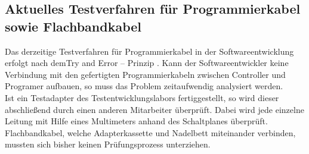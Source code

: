 
\subsection{Aktuelles Testverfahren für Programmierkabel sowie Flachbandkabel}
Das derzeitige Testverfahren für Programmierkabel in der Softwareentwicklung erfolgt nach dem\glqq Try and Error – Prinzip \grqq{} . Kann der Softwareentwickler keine Verbindung mit den gefertigten Programmierkabeln zwischen Controller und Programer aufbauen, so muss das Problem zeitaufwendig analysiert werden.
\\
Ist ein Testadapter des Testentwicklungslabors fertiggestellt, so wird dieser abschließend durch einen anderen Mitarbeiter überprüft. Dabei wird jede einzelne Leitung mit Hilfe eines Multimeters anhand des Schaltplanes überprüft. Flachbandkabel, welche Adapterkassette und Nadelbett miteinander verbinden, mussten sich bisher keinen Prüfungsprozess unterziehen. 

